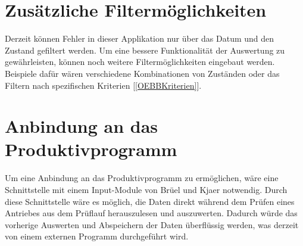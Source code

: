 \section{Zusätzliche Filtermöglichkeiten}
Derzeit können Fehler in dieser Applikation nur über das Datum und den Zustand gefiltert werden. Um eine bessere Funktionalität der 
Auswertung zu gewährleisten, können noch weitere Filtermöglichkeiten eingebaut werden. Beispiele dafür wären verschiedene Kombinationen 
von Zuständen oder das Filtern nach spezifischen Kriterien [\ref{OEBBKriterien}]. 

\section{Anbindung an das Produktivprogramm}
Um eine Anbindung an das Produktivprogramm zu ermöglichen, wäre eine Schnittstelle mit einem Input-Module von Brüel und Kjaer notwendig.
Durch diese Schnittstelle wäre es möglich, die Daten direkt während dem Prüfen eines Antriebes aus dem Prüflauf herauszulesen und 
auszuwerten. Dadurch würde das vorherige Auswerten und Abspeichern der Daten überflüssig werden, was derzeit von einem externen 
Programm durchgeführt wird.
